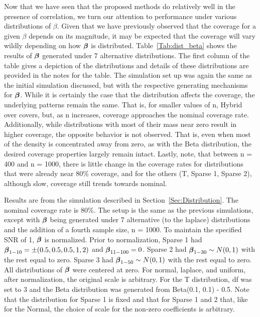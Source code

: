 Now that we have seen that the proposed methods do relatively well in the presence of correlation, we turn our attention to performance under various distributions of $\beta$. Given that we have previously observed that the coverage for a given $\beta$ depends on its magnitude, it may be expected that the coverage will vary wildly depending on how $\boldsymbol{\beta}$ is distributed. Table~\ref{Tab:dist_beta} shows the results of $\boldsymbol{\beta}$ generated under 7 alternative distributions. The first column of the table gives a depiction of the distributions and details of these distributions are provided in the notes for the table. The simulation set up was again the same as the initial simulation discussed, but with the respective generating mechanisms for $\boldsymbol{\beta}$. While it is certainly the case that the distribution affects the coverage, the underlying patterns remain the same. That is, for smaller values of n, Hybrid over covers, but, as n increases, coverage approaches the nominal coverage rate. Additionally, while distributions with most of their mass near zero result in higher coverage, the opposite behavior is not observed. That is, even when most of the density is concentrated away from zero, as with the Beta distribution, the desired coverage properties largely remain intact. Lastly, note, that between n = 400 and n = 1000, there is little change in the coverage rates for distributions that were already near 80\% coverage, and for the others (T, Sparse 1, Sparse 2), although slow, coverage still trends towards nominal.

\begin{table}[hbtp]
  \centering
  
  \caption{\label{Tab:dist_beta} Results are from the simulation described in Section~\ref{Sec:Distribution}. The nominal coverage rate is 80\%. The setup is the same as the previous simulations, except with $\boldsymbol{\beta}$ being generated under 7 alternative (to the laplace) distributions and the addition of a fourth sample size, n = 1000. To maintain the specified SNR of 1, $\boldsymbol{\beta}$ is normalized. Prior to normalization, Sparse 1 had $\boldsymbol{\beta}_{1-10} = \pm(0.5, 0.5, 0.5, 1, 2)$ and $\boldsymbol{\beta}_{11-100} = 0$. Sparse 2 had $\boldsymbol{\beta}_{1-30} \sim N(0, 1)$ with the rest equal to zero.  Sparse 3 had $\boldsymbol{\beta}_{1-50} \sim N(0, 1)$ with the rest equal to zero. All distributions of $\boldsymbol{\beta}$ were centered at zero. For normal, laplace, and uniform, after normalization, the original scale is arbitrary. For the T distribution, df was set to 3 and the Beta distribution was generated from Beta(0.1, 0.1) - 0.5. Note that the distribution for Sparse 1 is fixed and that for Sparse 1 and 2 that, like for the Normal, the choice of scale for the non-zero coefficients is arbitrary.}
\end{table}

